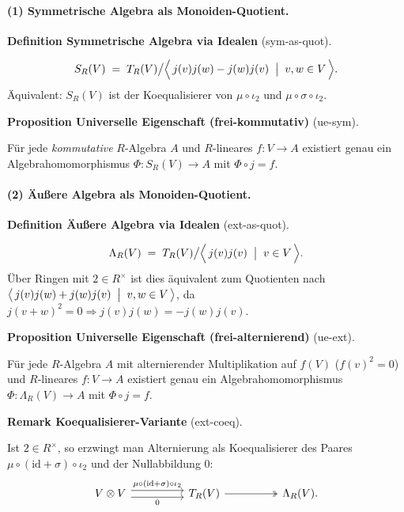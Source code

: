 \documentclass[10pt, letterpaper]{article}
\newcommand{\CustomHeading}[3]{%
  \par\medskip\noindent%
  \textbf{#1 #2} \textnormal{(#3)}.\enskip%
}
\newenvironment{DEF}[2]{\begin{unitbox}\CustomHeading{Definition}{#1}{#2}}{\end{unitbox}}
\newenvironment{PROP}[2]{\begin{unitbox}\CustomHeading{Proposition}{#1}{#2}}{\end{unitbox}}
\newenvironment{REM}[2]{\begin{unitbox}\CustomHeading{Remark}{#1}{#2}}{\end{unitbox}}
\begin{document}
\paragraph{(1) Symmetrische Algebra als Monoiden-Quotient.}
\begin{DEF}{Symmetrische Algebra via Idealen}{sym-as-quot}
\[
S_R(V)\;=\;T_R(V)\big/\Big\langle\, j(v)j(w)-j(w)j(v)\;\bigm|\;v,w\in V\,\Big\rangle.
\]
Äquivalent: \(S_R(V)\) ist der Koequalisierer von \(\mu\circ\iota_2\) und \(\mu\circ\sigma\circ\iota_2\).
\end{DEF}

\begin{PROP}{Universelle Eigenschaft (frei-kommutativ)}{ue-sym}
Für jede \emph{kommutative} \(R\)-Algebra \(A\) und \(R\)-lineares \(f:V\to A\) existiert genau ein Algebrahomomorphismus \(\Phi:S_R(V)\to A\) mit \(\Phi\circ j=f\).
\end{PROP}

\paragraph{(2) Äußere Algebra als Monoiden-Quotient.}
\begin{DEF}{Äußere Algebra via Idealen}{ext-as-quot}
\[
\Lambda_R(V)\;=\;T_R(V)\big/\Big\langle\, j(v)j(v)\;\bigm|\;v\in V\,\Big\rangle.
\]
Über Ringen mit \(2\in R^\times\) ist dies äquivalent zum Quotienten nach 
\(\big\langle\, j(v)j(w)+j(w)j(v)\;\bigm|\;v,w\in V\,\big\rangle\),
da \(j(v+w)^2=0 \Rightarrow j(v)j(w)=-j(w)j(v)\).
\end{DEF}

\begin{PROP}{Universelle Eigenschaft (frei-alternierend)}{ue-ext}
Für jede \(R\)-Algebra \(A\) mit alternierender Multiplikation auf \(f(V)\) (\(f(v)^2=0\)) und \(R\)-lineares \(f:V\to A\) existiert genau ein Algebrahomomorphismus \(\Phi:\Lambda_R(V)\to A\) mit \(\Phi\circ j=f\).
\end{PROP}

\begin{REM}{Koequalisierer-Variante}{ext-coeq}
Ist \(2\in R^\times\), so erzwingt man Alternierung als Koequalisierer des Paares \(\mu\circ(\mathrm{id}+\sigma)\circ\iota_2\) und der Nullabbildung \(0\):
\[
\begin{tikzcd}[column sep=huge]
V\otimes V \arrow[r, shift left=0.7ex, "\mu\circ(\mathrm{id}+\sigma)\circ\iota_2"] \arrow[r, shift right=0.7ex, swap, "0"] & T_R(V) \arrow[r, two heads] & \Lambda_R(V).
\end{tikzcd}
\]
\end{REM}
\end{document}
